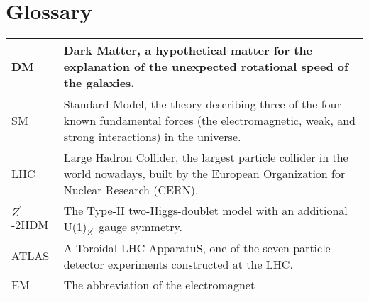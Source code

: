 \documentclass[class=NTHU_thesis, crop=false]{standalone}
\begin{document}
\chapter{Glossary}
\begin{table}[h]
    \normalsize
    \centering
    \begin{tabularx}{1\textwidth}{ l @{\quad:\quad} X }
    	DM & Dark Matter, a hypothetical matter for the explanation of the unexpected rotational speed of the galaxies. \\
    	\hline
    	SM & Standard Model, the theory describing three of the four known fundamental forces (the electromagnetic, weak, and strong interactions) in the universe. \\
    	\hline
    	LHC & Large Hadron Collider, the largest particle collider in the world nowadays, built by the European Organization for Nuclear Research (CERN). \\
    	\hline
    	$Z^\prime$-2HDM & The Type-II two-Higgs-doublet model with an additional U(1)$_{Z^\prime}$ gauge symmetry. \\
    	\hline
    	ATLAS & A Toroidal LHC ApparatuS, one of the seven particle detector experiments constructed at the LHC. \\
    	\hline
    	EM & The abbreviation of the electromagnet \\
    	\hline
    \end{tabularx} 
    \label{table:glossary_def}
\end{table}
\end{document}
